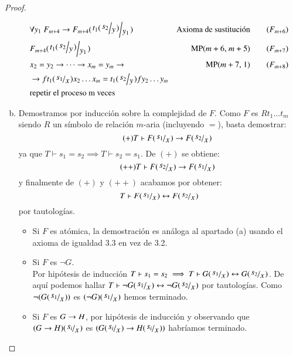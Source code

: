 \begin{proof}
\begin{enumerate}[(a)]
\begin{align*}
                & \forall y_1\ F_{m+4} \then F_{m+4}(\quo{t_1(\quo{s_2}{y})}{y_1})                                                       & \text{Axioma de sustitución} \tag{$F_{m+6}$}\\
                & F_{m+4}(\quo{t_1(\quo{s_2}{y})}{y_1})                                                                                  & \text{MP($m+6$, $m+5$)}\tag{$F_{m+7}$}\\
                & x_2 = y_2 \then \cdots \then x_m = y_m \then & \text{MP($m+7$, $1$)}\tag{$F_{m+8}$}\\
                &\then f t_1(\quo{s_1}{x}) x_2 \ldots x_m = t_1(\quo{s_2}{y}) f y_2 \ldots y_m &\\
                &\text{repetir el proceso m veces}&
            \end{align*}
        \item Demostramos por inducción sobre la complejidad de $F$. Como $F$ es $R t_1 \ldots t_m$ siendo $R$ un símbolo de relación $m$-aria (incluyendo $=$), basta demostrar:
            \begin{equation*}
                \tag{$+$} T \vdash F(\quo{s_1}{x}) \then F(\quo{s_2}{x})
            \end{equation*}
            ya que $T \vdash s_1 = s_2 \implies T \vdash s_2 = s_1$. De $(+)$ se obtiene:
            \begin{equation*}
                \tag{$++$} T \vdash F (\quo{s_2}{x}) \then F(\quo{s_1}{x})
            \end{equation*}
            y finalmente de $(+)$ y $(++)$ acabamos por obtener:
            $$
                T \vdash F(\quo{s_1}{x}) \bicond F(\quo{s_2}{x})
            $$
            por tautologías.
            \begin{itemize}
                \item Si $F$ es atómica, la demostración es análoga al apartado (a) usando el axioma de igualdad 3.3 en vez de 3.2.
                \item Si $F$ es $\neg G$.\\
                      Por hipótesis de inducción $T \vdash s_1 = s_2 \implies T \vdash G(\quo{s_1}{x}) \bicond G(\quox{s_2})$. De aquí podemos hallar $T \vdash \neg G(\quox{s_1}) \bicond \neg G(\quox{s_2})$ por tautologías.
                      Como $\neg(G(\quox{s_1}))$ es $(\neg G)(\quox{s_1})$ hemos terminado.
                \item Si $F$ es $G \rightarrow H$, por hipótesis de inducción y observando que $(G \then H)(\quox{s_i})$ es $(G(\quox{s_i}) \then H(\quox{s_i}))$ habríamos terminado.

\end{itemize}
\end{enumerate}
\end{proof}
